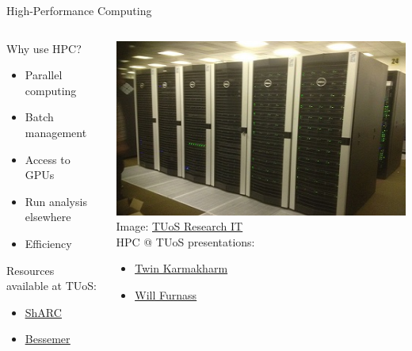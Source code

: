 \documentclass{beamer} %
\begin{document}
  \begin{frame}{High-Performance Computing}
    \begin{columns}
      \begin{column}{0.5\textwidth}
        Why use HPC?
        \begin{itemize}
          \item Parallel computing
          \item Batch management
          \item Access to GPUs
          \item Run analysis elsewhere
          \item Efficiency
        \end{itemize}

        \vspace{1cm}

        Resources available at TUoS:
        \begin{itemize}
          \item \href{https://docs.hpc.shef.ac.uk/en/latest/sharc/index.html}{\underline{ShARC}}
          \item \href{https://docs.hpc.shef.ac.uk/en/latest/bessemer/index.html}{\underline{Bessemer}}
        \end{itemize}
      \end{column}
      
      \begin{column}{0.5\textwidth}
        \includegraphics[width=\textwidth]{iceberg2014.jpg}
        \tiny
        Image: \href{https://www.sheffield.ac.uk/it-services/research/hpc/sharc}{TUoS Research IT}
        \small
        \\\vspace{1cm}
        HPC @ TUoS presentations:
        \begin{itemize}
          \item \href{https://rse.shef.ac.uk/uos-hpc-resources-presentation/}{\underline{Twin Karmakharm}}
          \item \href{https://rse.shef.ac.uk/rse-dcs-pres-on-hpc/}{\underline{Will Furnass}}
        \end{itemize}
      \end{column}
    \end{columns}
  \end{frame}
\end{document}
